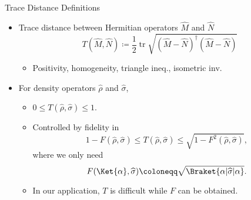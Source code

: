 \documentclass{beamer}
\newcommand{\rbr}[1]{{\left(#1\right)}}
\newcommand{\rfun}[2]{{#1}\mathopen{}\left(#2\right)\mathclose{}}
\newcommand{\what}[1]{{\widehat{#1}}}
\DeclareMathOperator{\tr}{tr}
\begin{document}
\begin{frame}{Trace Distance \cite[ch.~9]{Wilde2009}}{Definitions}
\begin{itemize}
\item Trace distance between Hermitian operators $\what{M}$ and $\what{N}$
\begin{equation}
\rfun{T}{\what{M}, \what{N}} \coloneqq \frac{1}{2} 
\tr \sqrt{\rbr{\what{M}-\what{N}}^\dagger\rbr{\what{M}-\what{N}}}
\label{eq:def-trace-dist}
\end{equation}
\begin{itemize}
\item Positivity, homogeneity, triangle ineq., isometric inv.
\end{itemize}
\item For \alert{density operators} $\what{\rho}$ and $\what{\sigma}$,
\begin{itemize}
\item $0 \le \rfun{T}{\what{\rho}, \what{\sigma}} \le 1.$
\item Controlled by \alert{fidelity} in \cite{Fuchs1999}
\begin{equation}
1 - \rfun{F}{\what{\rho},\what{\sigma}} \le \rfun{T}{\what{\rho},\what{\sigma}}
\le \sqrt{1 - \rfun{F^2}{\what{\rho},\what{\sigma}}},
\label{eq:ineq-fvdg}
\end{equation}
where we only need
\begin{equation}
\rfun{F}{\Ket{\alpha},\what{\sigma}} \coloneqq \sqrt{\Braket{\alpha | 
\what{\sigma} | \alpha}}.
\end{equation}
\item In our application, $T$ is difficult while $F$ can be obtained.
\end{itemize}
\end{itemize}
\end{frame}
\end{document}
